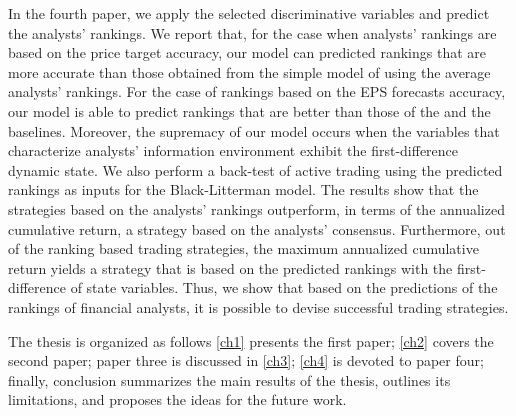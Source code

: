 In the fourth paper, we apply the selected discriminative variables and predict the analysts' rankings. We report that, for the case when analysts' rankings are based on the price target accuracy,  our model can predicted rankings that are more  accurate than those obtained from the simple model of using the  average analysts' rankings. For the case of rankings based on the EPS forecasts accuracy, our model is able to predict rankings that are better than those of the  and the \naive{} baselines. Moreover, the supremacy of our model occurs when  the variables that characterize analysts' information environment exhibit the first-difference dynamic state. We also perform a back-test of active trading using the predicted rankings as inputs for the Black-Litterman model. The results show that the strategies based on the analysts' rankings outperform, in terms of the annualized cumulative return, a  strategy based on the analysts' consensus. Furthermore, out of the ranking based trading strategies, the maximum annualized cumulative return yields  a strategy that is based on the predicted rankings with the first-difference of state variables.  Thus, we show that based on the predictions of the rankings of financial analysts, it is possible to devise  successful trading strategies.

The thesis is organized as follows \ref{ch1} presents the first paper; \ref{ch2} covers the second paper; paper three is discussed in \ref{ch3}; \ref{ch4} is devoted to paper four; finally, conclusion summarizes the main results of the thesis, outlines its limitations, and proposes the ideas for the future work. 
